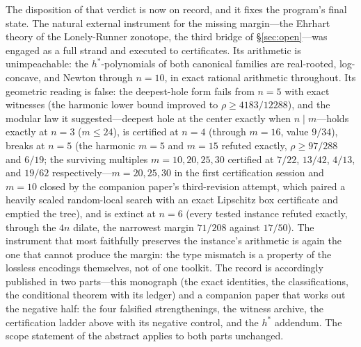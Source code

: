 The disposition of that verdict is now on record, and it fixes the
program's final state. The natural external instrument for the missing
margin---the Ehrhart theory of the Lonely-Runner zonotope, the third
bridge of \S\ref{sec:open}---was engaged as a full strand and executed
to certificates. Its arithmetic is unimpeachable: the $h^*$-polynomials
of both canonical families are real-rooted, log-concave, and Newton
through $n=10$, in exact rational arithmetic throughout. Its geometric
reading is false: the deepest-hole form fails from $n=5$ with exact
witnesses (the harmonic lower bound improved to $\rho\ge 4183/12288$),
and the modular law it suggested---deepest hole at the center exactly
when $n\mid m$---holds exactly at $n=3$ ($m\le 24$), is certified at
$n=4$ (through $m=16$, value $9/34$), breaks at $n=5$ (the harmonic
$m=5$ and $m=15$ refuted exactly, $\rho\ge 97/288$ and $6/19$; the
surviving multiples $m=10,20,25,30$ certified at $7/22$, $13/42$,
$4/13$, and $19/62$ respectively---$m=20,25,30$ in the first
certification session and $m=10$ closed by the companion paper's
third-revision attempt, which paired a heavily scaled random-local
search with an exact Lipschitz box certificate and emptied the tree),
and is
extinct at $n=6$ (every tested instance refuted exactly, through the
$4n$ dilate, the narrowest margin $71/208$ against $17/50$). The
instrument that most faithfully preserves the instance's arithmetic is
again the one that cannot produce the margin: the type mismatch is a
property of the lossless encodings themselves, not of one toolkit.
The record is accordingly published in two parts---this monograph (the
exact identities, the classifications, the conditional theorem with
its ledger) and a companion paper \cite{companion-paper} that works
out the negative half: the four falsified strengthenings, the witness
archive, the certification ladder above with its negative control, and
the $h^*$ addendum. The scope statement of the abstract applies to
both parts unchanged.
